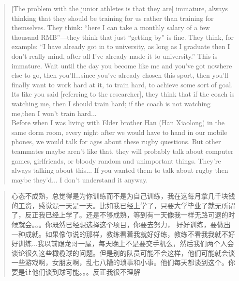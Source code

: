 \begin{CJK}{UTF8}{gbsn}
  \begin{quote}
    [The problem with the junior athletes is that they are] immature, always thinking that they should be training for us rather than training for themselves.  They think: ``here I can take a monthly salary of a few thousand RMB''---they think that just ``getting by'' is fine.  They think, for example: ``I have already got in to university, as long as I graduate then I don't really mind, after all I've already made it to university.''  This is immature.  Wait until the day you become like me and you've got nowhere else to go, then you'll...since you've already chosen this sport, then you'll finally want to work hard at it, to train hard, to achieve some sort of goal.  Its like you said [referring to the researcher], they think that if the coach is watching me, then I should train hard; if the coach is not watching me,then I won't train hard...\\

    Before when I was living with Elder brother Han (Han Xiaolong) in the same dorm room, every night after we would have to hand in our mobile phones, we would talk for ages about these rugby questions. But other teammates maybe aren't like that, they will probably talk about computer games, girlfriends, or bloody random and unimportant things.  They're always talking about this... If you wanted them to talk about rugby then maybe they'd... I don't understand it anyway.
  \end{quote}

  \begin{quote}
    心态不成熟，总觉得是为你训练而不是为自己训练，我在这每月拿几千块钱的工资，感觉混一天是一天。比如我已经上学了，只要大学毕业了就无所谓了，反正我已经上学了。还是不够成熟，等到有一天像我一样无路可退的时候就会。。。你既然已经想选择这个项目，你要去努力， 好好训练，要做出一种成就。如果像你说的那样，教练看着我就好好练，教练不看我我就不好好训练...我以前跟龙哥一屋，每天晚上不是要交手机么，然后我们两个人会谈论很久这些橄榄球的问题。但是别的队员可能不会这样，他们可能就会谈一些游戏啊，女朋友啊，乱七八糟的琐事和小事。他们每天都谈到这个。你要是让他们谈到球可能。。。反正我很不理解
  \end{quote}


\end{CJK}
